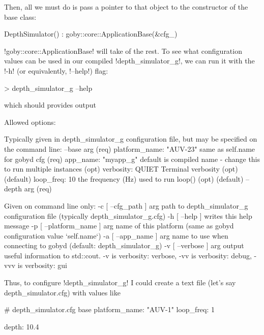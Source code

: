 Then, all we must do is pass a pointer to that object to the constructor of the base class:
\begin{boxedverbatim}
    DepthSimulator()
        : goby::core::ApplicationBase(&cfg_)
\end{boxedverbatim}
\resetbvlinenumber
!goby::core::ApplicationBase! will take of the rest. To see what configuration values can be used in our compiled !depth_simulator_g!, we can run it with the !-h! (or equivalently, !--help!) flag:
\begin{boxedverbatim}
> depth_simulator_g --help
\end{boxedverbatim}
\resetbvlinenumber

which should provides output 
\begin{boxedverbatim}
Allowed options:

Typically given in depth_simulator_g configuration file,
but may be specified on the command line:
  --base arg             (req)
                          platform_name: "AUV-23"  same as self.name for 
                                                   gobyd cfg (req)
                          app_name: "myapp_g"  default is compiled name - 
                                               change this to run multiple 
                                               instances (opt)
                          verbosity: QUIET  Terminal verbosity 
                                            (opt) (default)
                          loop_freq: 10  the frequency (Hz) used to run 
                                         loop() (opt) (default)
  --depth arg            (req)

Given on command line only:
  -c [ --cfg_path ] arg      path to depth_simulator_g configuration file 
                             (typically depth_simulator_g.cfg)
  -h [ --help ]              writes this help message
  -p [ --platform_name ] arg name of this platform (same as gobyd configuration
                             value `self.name`)
  -a [ --app_name ] arg      name to use when connecting to gobyd (default: 
                             depth_simulator_g)
  -v [ --verbose ] arg       output useful information to std::cout. -v is 
                             verbosity: verbose, -vv is verbosity: debug, -vvv 
                             is verbosity: gui
\end{boxedverbatim}
\resetbvlinenumber

Thus, to configure !depth_simulator_g! I could create a text file (let's say depth\_simulator.cfg) with values like
\begin{boxedverbatim}
# depth_simulator.cfg
base
{
    platform_name: "AUV-1"
    loop_freq: 1
}

depth: 10.4
\end{boxedverbatim}
\resetbvlinenumber

